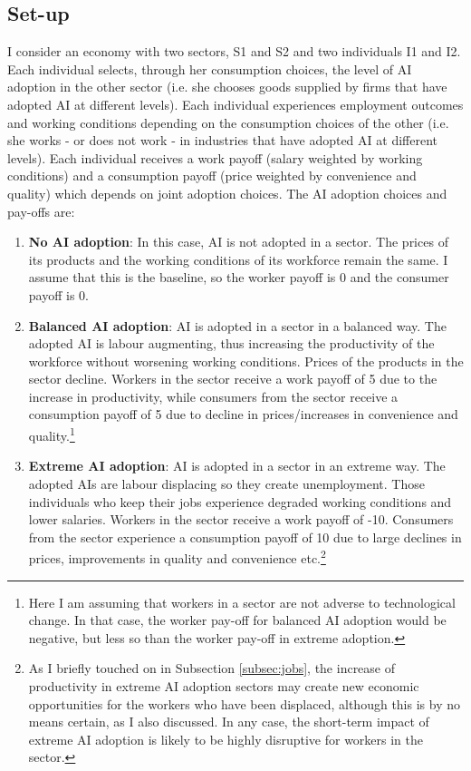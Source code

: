 \documentclass[11pt]{article}
\begin{document}
\subsection{Set-up}
\label{subsec:setup}
I consider an economy with two sectors, S1 and S2 and two individuals I1 and I2. Each individual selects, through her consumption choices, the level of AI adoption in the other sector (i.e. she chooses goods supplied by firms that have adopted AI at different levels). Each individual experiences employment outcomes and working conditions depending on the consumption choices of the other (i.e. she works - or does not work - in industries that have adopted AI at different levels). Each individual receives a work payoff (salary weighted by working conditions) and a consumption payoff (price weighted by convenience and quality) which depends on joint adoption choices. The AI adoption choices and pay-offs are:

\begin{enumerate}
    \item \textbf{No AI adoption}: In this case, AI is not adopted in a sector. The prices of its products and the working conditions of its workforce remain the same. I assume that this is the baseline, so the worker payoff is 0 and the consumer payoff is 0.
    \item \textbf{Balanced AI adoption}: AI is adopted in a sector in a balanced way. The adopted AI is labour augmenting, thus increasing the productivity of the workforce without worsening working conditions. Prices of the products in the sector decline. Workers in the sector receive a work payoff of 5 due to the increase in productivity, while consumers from the sector receive a consumption payoff of 5 due to decline in prices/increases in convenience and quality.\footnote{Here I am assuming that workers in a sector are not adverse to technological change. In that case, the worker pay-off for balanced AI adoption would be negative, but less so than the worker pay-off in extreme adoption.} 
    \item \textbf{Extreme AI adoption}: AI is adopted in a sector in an extreme way. The adopted AIs are labour displacing so they create unemployment. Those individuals who keep their jobs experience degraded working conditions and lower salaries. Workers in the sector receive a work payoff of -10. Consumers from the sector experience a consumption payoff of 10 due to large declines in prices, improvements in quality and convenience etc.\footnote{As I briefly touched on in Subsection \ref{subsec:jobs}, the increase of productivity in extreme AI adoption sectors may create new economic opportunities for the workers who have been displaced, although this is by no means certain, as I also discussed. In any case, the short-term impact of extreme AI adoption is likely to be highly disruptive for workers in the sector.}
\end{enumerate}
\end{document}
